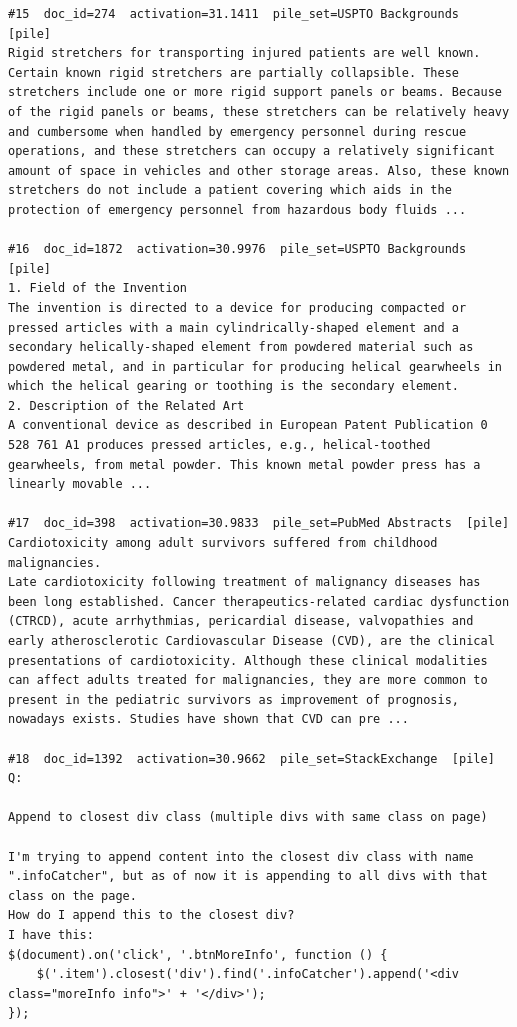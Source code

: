\begin{verbatim}
#15  doc_id=274  activation=31.1411  pile_set=USPTO Backgrounds  [pile]
Rigid stretchers for transporting injured patients are well known. Certain known rigid stretchers are partially collapsible. These stretchers include one or more rigid support panels or beams. Because of the rigid panels or beams, these stretchers can be relatively heavy and cumbersome when handled by emergency personnel during rescue operations, and these stretchers can occupy a relatively significant amount of space in vehicles and other storage areas. Also, these known stretchers do not include a patient covering which aids in the protection of emergency personnel from hazardous body fluids ...

#16  doc_id=1872  activation=30.9976  pile_set=USPTO Backgrounds  [pile]
1. Field of the Invention
The invention is directed to a device for producing compacted or pressed articles with a main cylindrically-shaped element and a secondary helically-shaped element from powdered material such as powdered metal, and in particular for producing helical gearwheels in which the helical gearing or toothing is the secondary element.
2. Description of the Related Art
A conventional device as described in European Patent Publication 0 528 761 A1 produces pressed articles, e.g., helical-toothed gearwheels, from metal powder. This known metal powder press has a linearly movable ...

#17  doc_id=398  activation=30.9833  pile_set=PubMed Abstracts  [pile]
Cardiotoxicity among adult survivors suffered from childhood malignancies.
Late cardiotoxicity following treatment of malignancy diseases has been long established. Cancer therapeutics-related cardiac dysfunction (CTRCD), acute arrhythmias, pericardial disease, valvopathies and early atherosclerotic Cardiovascular Disease (CVD), are the clinical presentations of cardiotoxicity. Although these clinical modalities can affect adults treated for malignancies, they are more common to present in the pediatric survivors as improvement of prognosis, nowadays exists. Studies have shown that CVD can pre ...

#18  doc_id=1392  activation=30.9662  pile_set=StackExchange  [pile]
Q:

Append to closest div class (multiple divs with same class on page)

I'm trying to append content into the closest div class with name ".infoCatcher", but as of now it is appending to all divs with that class on the page.
How do I append this to the closest div?
I have this:
$(document).on('click', '.btnMoreInfo', function () {
    $('.item').closest('div').find('.infoCatcher').append('<div class="moreInfo info">' + '</div>');
});


\end{verbatim}
